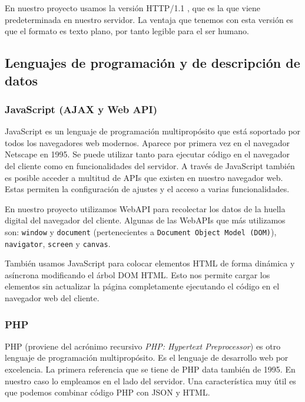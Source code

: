 En nuestro proyecto usamos la versión HTTP/1.1 , que es la que viene predeterminada en nuestro servidor. La ventaja que tenemos con esta versión es que el formato es texto plano, por tanto legible para el ser humano. \par

\subsection{Lenguajes de programación y de descripción de datos}

\subsubsection{JavaScript (AJAX y Web API)}
JavaScript es un lenguaje de programación multipropósito que está soportado por todos los navegadores web modernos. Aparece por primera vez en el navegador Netscape en 1995. Se puede utilizar tanto para ejecutar código en el navegador del cliente como en funcionalidades del servidor. A través de JavaScript también es posible acceder a multitud de APIs que existen en nuestro navegador web. Estas permiten la configuración de ajustes y el acceso a varias funcionalidades.\par

En nuestro proyecto utilizamos WebAPI para recolectar los datos de la huella digital del navegador del cliente. Algunas de las WebAPIs que más utilizamos son: \texttt{window} y \texttt{document} (pertenecientes a \texttt{Document Object Model (DOM)}), \texttt{navigator}, \texttt{screen} y \texttt{canvas}. \par 

También usamos JavaScript para  colocar elementos HTML de forma dinámica y asíncrona modificando el árbol DOM HTML. Esto nos permite cargar los elementos sin actualizar la página completamente ejecutando el código en el navegador web del cliente.\par

\subsubsection{PHP}

PHP (proviene del acrónimo recursivo \textit{PHP: Hypertext Preprocessor}) es otro lenguaje de programación multipropósito. Es el lenguaje de desarrollo web por excelencia. La primera referencia que se tiene de PHP data también de 1995. En nuestro caso lo empleamos en el lado del servidor. Una característica muy útil es que podemos combinar código PHP con JSON y HTML. \par 


